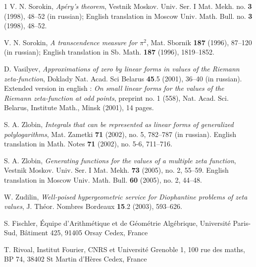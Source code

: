 \documentclass[reqno,12pt]{amsart}
\numberwithin{equation}{section}
\theoremstyle{remark}
\begin{document}
\begin{thebibliography}{1}
 V. N. Sorokin, {\em Ap\'ery's theorem}, Vestnik Moskov. Univ. Ser. I Mat. Mekh. no. {\bf 3} (1998), 48--52 
(in russian); English translation in Moscow Univ. Math. Bull. no. {\bf 3} (1998), 48--52.

 V. N. Sorokin, {\em A transcendence measure for $\pi^2$}, Mat. Sbornik {\bf 187} (1996),
87--120 (in russian); English translation in  Sb. Math. {\bf 187} (1996),  1819--1852.

 D. Vasilyev, {\em Approximations of zero by linear forms in values of the 
Riemann zeta-function}, Doklady Nat. Acad. Sci Belarus {\bf 45}.5 (2001), 36--40 (in russian). Extended version in 
english : {\em On small linear forms for the values of the Riemann zeta-function at odd points},
preprint no. 1 (558), Nat. Acad. Sci. Belarus, Institute Math., Minsk (2001), 14 pages.

 S. A. Zlobin, {\em  Integrals that can be represented as linear forms of generalized polylogarithms}, 
 Mat. Zametki {\bf 71} (2002), no. 5, 782--787 (in russian). English translation in
Math. Notes {\bf 71} (2002), no. 5-6, 711--716. 

 S. A. Zlobin, 
{\em Generating functions for the values of a multiple zeta function}, 
Vestnik Moskov. Univ. Ser. I Mat. Mekh. {\bf 73} (2005), no. 2, 55--59. English translation in
Moscow Univ. Math. Bull. {\bf 60} (2005), no. 2, 44--48. 

 W. Zudilin, {\em Well-poised hypergeometric service for Diophantine problems of zeta values}, 
J. Th\'eor. Nombres Bordeaux {\bf 15}.2 (2003), 593--626.

\end{thebibliography}

S. Fischler, \'Equipe d'Arithm\'etique et de G\'eom\'etrie Alg\'ebrique, 
Universit\'e Paris-Sud, B\^atiment 425,
91405 Orsay Cedex, France

T. Rivoal,  Institut Fourier,  CNRS et Universit\'e Grenoble 1, 
100 rue des maths, BP 74, 38402 St Martin d'H\`eres Cedex, France 
\end{document}
